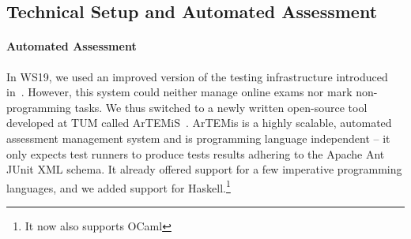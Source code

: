 \subsection{Technical Setup and Automated Assessment}\label{sec:tech_setup_test}

\paragraph{Automated Assessment}
In WS19, we used an improved version of
the testing infrastructure introduced in~\cite{next_1100}.
However, this system could neither manage online exams nor mark non-programming tasks.
We thus switched to a newly written open-source
tool developed at TUM called ArTEMiS~\cite{artemis}.
ArTEMis is a highly scalable, automated assessment management system and is programming language independent --
it only expects test runners to produce tests results
adhering to the Apache Ant JUnit XML schema.
It already offered support for a few imperative programming languages,
and we added support for Haskell.\footnote{It now also supports OCaml}

